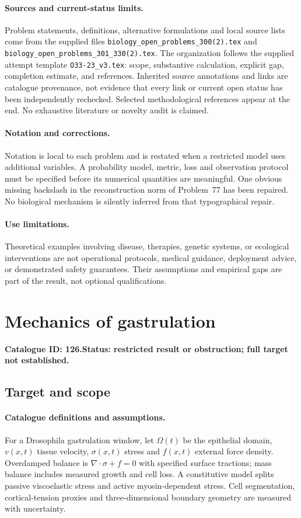\documentclass[11pt]{article}
\begin{document}
\paragraph{Sources and current-status limits.}
Problem statements, definitions, alternative formulations and local source lists
come from the supplied files
\texttt{biology\_open\_problems\_300(2).tex} and
\texttt{biology\_open\_problems\_301\_330(2).tex}.
The organization follows the supplied attempt template
\texttt{O33-23\_v3.tex}: scope, substantive calculation, explicit gap,
completion estimate, and references. Inherited source annotations and links are
catalogue provenance, not evidence that every link or current open status has
been independently rechecked. Selected methodological references appear at the
end. No exhaustive literature or novelty audit is claimed.

\paragraph{Notation and corrections.}
Notation is local to each problem and is restated when a restricted model uses
additional variables. A probability model, metric, loss and observation protocol
must be specified before its numerical quantities are meaningful. One obvious
missing backslash in the reconstruction norm of Problem~77 has been repaired.
No biological mechanism is silently inferred from that typographical repair.

\paragraph{Use limitations.}
Theoretical examples involving disease, therapies, genetic systems, or ecological
interventions are not operational protocols, medical guidance, deployment advice,
or demonstrated safety guarantees. Their assumptions and empirical gaps are part
of the result, not optional qualifications.

\setcounter{section}{125}
\section{Mechanics of gastrulation}
\label{prob:126}
\noindent\textbf{Catalogue ID: 126.}\quad \textbf{Status: restricted result or obstruction; full target not established.}
\subsection{Target and scope}
\paragraph{Catalogue definitions and assumptions.}
For a Drosophila gastrulation window, let $\Omega(t)$ be the epithelial domain, $v(x,t)$ tissue velocity, $\sigma(x,t)$ stress and $f(x,t)$ external force density. Overdamped balance is $\nabla\!\cdot\sigma+f=0$ with specified surface tractions; mass balance includes measured growth and cell loss. A constitutive model splits passive viscoelastic stress and active myosin-dependent stress. Cell segmentation, cortical-tension proxies and three-dimensional boundary geometry are measured with uncertainty.
\end{document}
